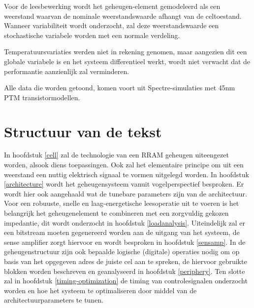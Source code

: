 Voor de leesbewerking wordt het geheugen-element gemodeleerd als een weerstand waarvan de nominale weerstandswaarde afhangt van de celtoestand. Wanneer variabiliteit wordt onderzocht, zal deze weerstandswaarde een stochastische variabele worden met een normale verdeling.

Temperatuursvariaties werden niet in rekening genomen, maar aangezien dit een globale variabele is en het systeem differentieel werkt, wordt niet verwacht dat de performantie aanzienlijk zal verminderen.

Alle data die worden getoond, komen voort uit Spectre-simulaties met 45nm PTM transistormodellen.

\section{Structuur van de tekst}
In hoofdstuk \ref{cell} zal de technologie van een RRAM geheugen uiteengezet worden, alsook diens toepassingen. Ook zal het elementaire principe om uit een weerstand een nuttig elektrisch signaal te vormen uitgelegd worden. In hoofdstuk \ref{architecture} wordt het geheugensysteem vanuit vogelperspectief besproken. Er wordt hier ook aangehaald wat de tunebare parameters zijn van de architectuur. Voor een robuuste, snelle en laag-energetische leesoperatie uit te voeren is het belangrijk het geheugenelement te combineren met een zorgvuldig gekozen impedantie, dit wordt onderzocht in hoofdstuk \ref{loadanalysis}. Uiteindelijk zal er een bitstream moeten gegenereerd worden aan de uitgang van het systeem, de sense amplifier zorgt hiervoor en wordt besproken in hoofdstuk \ref{sensamp}.
In de geheugenstructuur zijn ook bepaalde logische (digitale) operaties nodig om op basis van het opgegeven adres de juiste cel aan te spreken, de hiervoor gebruikte blokken worden beschreven en geanalyseerd in hoofdstuk \ref{periphery}.
Ten slotte zal in hoofdstuk \ref{timing-optimization} de timing van controlesignalen onderzocht worden en hoe het systeem te optimaliseren door middel van de architectuurparameters te tunen.